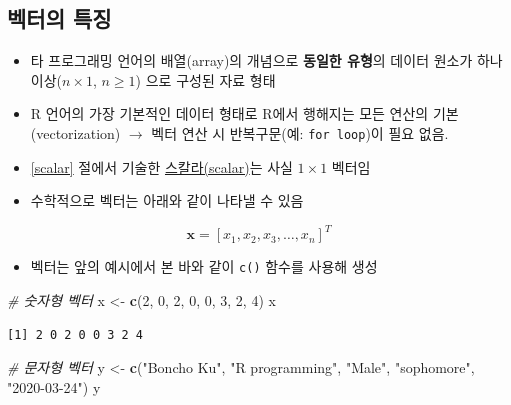 \documentclass[
  11pt,
]{krantz}
\newenvironment{Shaded}{\begin{snugshade}}{\end{snugshade}}
\newcommand{\CommentTok}[1]{\textcolor[rgb]{0.37,0.37,0.37}{\textit{#1}}}
\newcommand{\DecValTok}[1]{\textcolor[rgb]{0.06,0.06,0.06}{#1}}
\newcommand{\KeywordTok}[1]{\textcolor[rgb]{0.27,0.27,0.27}{\textbf{#1}}}
\newcommand{\NormalTok}[1]{#1}
\newcommand{\StringTok}[1]{\textcolor[rgb]{0.5,0.5,0.5}{#1}}
\providecommand{\tightlist}{%
  \setlength{\itemsep}{0pt}\setlength{\parskip}{0pt}}
\begin{document}
\hypertarget{vector-prop}{%
\subsection{벡터의 특징}\label{vector-prop}}

\begin{itemize}
\tightlist
\item
  타 프로그래밍 언어의 배열(array)의 개념으로 \textbf{동일한 유형}의 데이터 원소가 하나 이상(\(n \times 1\), \(n \geq 1\)) 으로 구성된 자료 형태
\item
  R 언어의 가장 기본적인 데이터 형태로 R에서 행해지는 모든 연산의 기본(vectorization) \(\rightarrow\) 벡터 연산 시 반복구문(예: \texttt{for\ loop})이 필요 없음.
\item
  \ref{scalar} 절에서 기술한 \protect\hyperlink{scalar}{스칼라(scalar)}는 사실 \(1 \times 1\) 벡터임
\item
  수학적으로 벡터는 아래와 같이 나타낼 수 있음
\end{itemize}

\[\mathrm{\mathbf x} = [x_1, x_2, x_3, \ldots, x_n]^T
\]

\begin{itemize}
\tightlist
\item
  벡터는 앞의 예시에서 본 바와 같이 \texttt{c()} 함수를 사용해 생성
\end{itemize}

\footnotesize

\begin{Shaded}
\begin{Highlighting}[]
\CommentTok{# 숫자형 벡터 }
\NormalTok{x <-}\StringTok{ }\KeywordTok{c}\NormalTok{(}\DecValTok{2}\NormalTok{, }\DecValTok{0}\NormalTok{, }\DecValTok{2}\NormalTok{, }\DecValTok{0}\NormalTok{, }\DecValTok{0}\NormalTok{, }\DecValTok{3}\NormalTok{, }\DecValTok{2}\NormalTok{, }\DecValTok{4}\NormalTok{)}
\NormalTok{x}
\end{Highlighting}
\end{Shaded}

\begin{verbatim}
[1] 2 0 2 0 0 3 2 4
\end{verbatim}

\begin{Shaded}
\begin{Highlighting}[]
\CommentTok{# 문자형 벡터}
\NormalTok{y <-}\StringTok{ }\KeywordTok{c}\NormalTok{(}\StringTok{"Boncho Ku"}\NormalTok{, }\StringTok{"R programming"}\NormalTok{, }\StringTok{"Male"}\NormalTok{, }\StringTok{"sophomore"}\NormalTok{, }\StringTok{"2020-03-24"}\NormalTok{)}
\NormalTok{y}
\end{Highlighting}
\end{Shaded}
\end{document}
